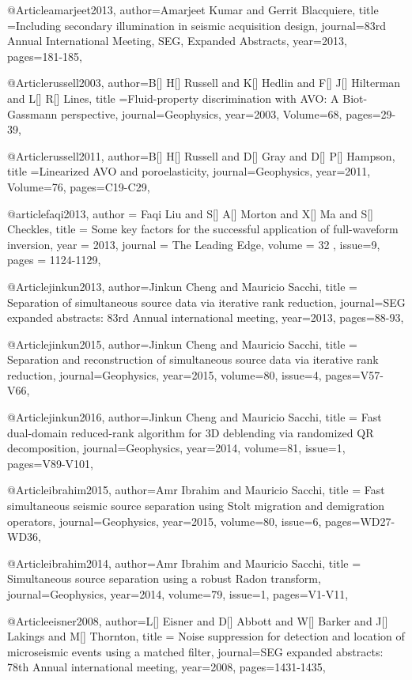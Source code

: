 {@Article{amarjeet2013,
  author={Amarjeet Kumar and Gerrit Blacquiere},
  title ={Including secondary illumination in seismic acquisition design},
  journal={83rd Annual International Meeting, SEG, Expanded Abstracts},
  year=2013,
  pages={181-185},
}

@Article{russell2003,
  author={B[] H[] Russell and K[] Hedlin and F[] J[] Hilterman and L[] R[] Lines},
  title ={Fluid-property discrimination with AVO: A Biot-Gassmann perspective},
  journal={Geophysics},
  year=2003,
  Volume=68,
  pages={29-39},
}

@Article{russell2011,
  author={B[] H[] Russell and D[] Gray and D[] P[] Hampson},
  title ={Linearized AVO and poroelasticity},
  journal={Geophysics},
  year=2011,
  Volume=76,
  pages={C19-C29},
}

@article{faqi2013,
  author =	 {Faqi Liu and S[] A[] Morton and X[] Ma and S[] Checkles},
  title =	 {Some key factors for the successful application of full-waveform inversion},
  year =	 2013,
  journal =	 {The Leading Edge},
  volume = 32	 ,
  issue=9,
  pages =	 {1124-1129},
}


@Article{jinkun2013,
  author={Jinkun Cheng and Mauricio Sacchi},
  title = {Separation of simultaneous source data via iterative rank reduction},
  journal={SEG expanded abstracts: 83rd Annual international meeting},
  year=2013,
  pages={88-93},
}

@Article{jinkun2015,
  author={Jinkun Cheng and Mauricio Sacchi},
  title = {Separation and reconstruction of simultaneous source data via iterative rank reduction},
  journal={Geophysics},
  year=2015,
  volume=80,
  issue=4,
  pages={V57-V66},
}

@Article{jinkun2016,
  author={Jinkun Cheng and Mauricio Sacchi},
  title = {Fast dual-domain reduced-rank algorithm for 3{D} deblending via randomized QR decomposition},
  journal={Geophysics},
  year=2014,
  volume=81,
  issue=1,
  pages={V89-V101},
}

@Article{ibrahim2015,
  author={Amr Ibrahim and Mauricio Sacchi},
  title = {Fast simultaneous seismic source separation using Stolt migration and demigration operators},
  journal={Geophysics},
  year=2015,
  volume=80,
  issue=6,
  pages={WD27-WD36},
}

@Article{ibrahim2014,
  author={Amr Ibrahim and Mauricio Sacchi},
  title = {Simultaneous source separation using a robust Radon transform},
  journal={Geophysics},
  year=2014,
  volume=79,
  issue=1,
  pages={V1-V11},
}


@Article{eisner2008,
  author={L[] Eisner and D[] Abbott and W[] Barker and J[] Lakings and M[] Thornton},
  title = {Noise suppression for detection and location of microseismic events using a matched filter},
  journal={SEG expanded abstracts: 78th Annual international meeting},
  year=2008,
  pages={1431-1435},
}

}
